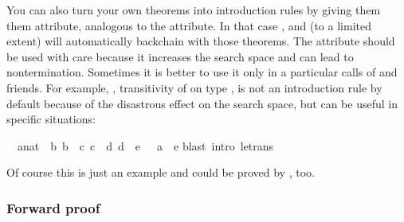 \begin{isabellebody}
\begin{isamarkuptext}
You can also turn your own theorems into introduction rules by giving them
them  attribute, analogous to the  attribute.  In
that case ,  and (to a limited extent)  will automatically backchain with those theorems. The 
attribute should be used with care because it increases the search space and
can lead to nontermination.  Sometimes it is better to use it only in a
particular calls of  and friends. For example,
, transitivity of  on type ,
is not an introduction rule by default because of the disastrous effect
on the search space, but can be useful in specific situations:%
\end{isamarkuptext}%
\isamarkuptrue%
\isamarkupfalse%
\ {}{}\ {}a{}{}nat{}\ {}\ b{}\ b\ {}\ c{}\ c\ {}\ d{}\ d\ {}\ e\ {}\ {}\ a\ {}\ e{}\isanewline
%
\isadelimproof
%
\endisadelimproof
%
\isatagproof
{}\isamarkupfalse%
{}blast\ intro{}\ le{}trans{}%
\endisatagproof
{\isafoldproof}%
%
\isadelimproof
%
\endisadelimproof
%
\begin{isamarkuptext}%
Of course this is just an example and could be proved by , too.

\subsubsection{Forward proof}
\label{sec:forward-proof}


\end{isamarkuptext}
\end{isabellebody}
